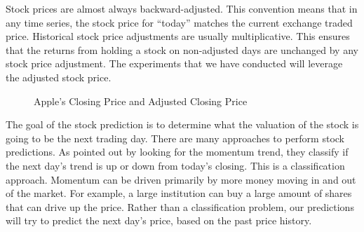 \documentclass[11pt]{article}
\begin{document}
Stock prices are almost always backward-adjusted. This convention means that in any time series, the stock price for ``today'' matches the current exchange traded price. Historical stock price adjustments are usually multiplicative. This ensures that the returns from holding a stock on non-adjusted days are unchanged by any stock price adjustment. The experiments that we have conducted will leverage the adjusted stock price.

\begin{figure}[!ht]
	\centering
	\caption{Apple's Closing Price and Adjusted Closing Price}
	\label{fig:adj-vs-close}
\end{figure}

The goal of the stock prediction is to determine what the valuation of the stock is going to be the next trading day. There are many approaches to perform stock predictions. As pointed out by \citet{Takeuchi2013ApplyingStocks} looking for the momentum trend, they classify if the next day's trend is up or down from today's closing. This is a classification approach. Momentum can be driven primarily by more money moving in and out of the market. For example, a large institution can buy a large amount of shares that can drive up the price. Rather than a classification problem, our predictions will try to predict the next day's price, based on the past price history.
\end{document}
